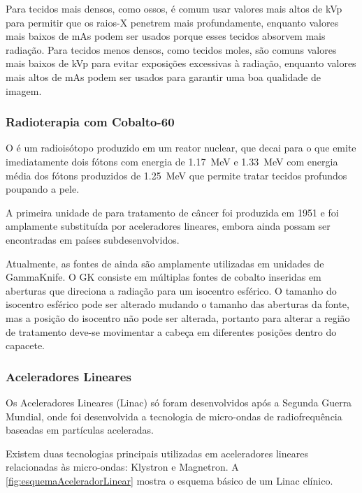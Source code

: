 \documentclass[11pt,a4paper]{article}
\begin{document}
                Para tecidos mais densos, como ossos, é comum usar valores mais altos de kVp para permitir que os raios-X penetrem mais profundamente, enquanto valores mais baixos de mAs podem ser usados porque esses tecidos absorvem mais radiação. Para tecidos menos densos, como tecidos moles, são comuns valores mais baixos de kVp para evitar exposições excessivas à radiação, enquanto valores mais altos de mAs podem ser usados para garantir uma boa qualidade de imagem.


            \subsubsection{Radioterapia com Cobalto-60}

                O  é um radioisótopo produzido em um reator nuclear, que decai para o  que emite imediatamente dois fótons com energia de \qty{1.17}{MeV} e \qty{1.33}{MeV} com energia média dos fótons produzidos de \qty{1.25}{MeV} que permite tratar tecidos profundos poupando a pele.
                
                A primeira unidade de  para tratamento de câncer foi produzida em 1951 e foi amplamente substituída por aceleradores lineares, embora ainda possam ser encontradas em países subdesenvolvidos.

                Atualmente, as fontes de  ainda são amplamente utilizadas em unidades de GammaKnife. O GK consiste em múltiplas fontes de cobalto inseridas em aberturas que direciona a radiação para um isocentro esférico. O tamanho do isocentro esférico pode ser alterado mudando o tamanho das aberturas da fonte, mas a posição do isocentro não pode ser alterada, portanto para alterar a região de tratamento deve-se movimentar a cabeça em diferentes posições dentro do capacete.

            \subsubsection{Aceleradores Lineares}

                Os Aceleradores Lineares (Linac) só foram desenvolvidos após a Segunda Guerra Mundial, onde foi desenvolvida a tecnologia de micro-ondas de radiofrequência baseadas em partículas aceleradas. 

                Existem duas tecnologias principais utilizadas em aceleradores lineares relacionadas às micro-ondas: Klystron e Magnetron. A \ref{fig:esquemaAceleradorLinear} mostra o esquema básico de um Linac clínico.
\end{document}
